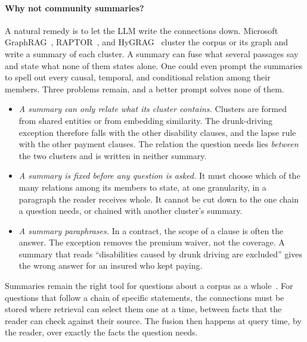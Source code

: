 \documentclass[sigconf, review, anonymous]{acmart}
\begin{document}
\paragraph{Why not community summaries?}
A natural remedy is to let the LLM write the connections down. Microsoft GraphRAG~\cite{edge2024local}, RAPTOR~\cite{sarthi2024raptor}, and HyGRAG~\cite{zhong2026hygrag} cluster the corpus or its graph and write a summary of each cluster. A summary can fuse what several passages say and state what none of them states alone. One could even prompt the summaries to spell out every causal, temporal, and conditional relation among their members. Three problems remain, and a better prompt solves none of them.
\begin{itemize}
  \item \emph{A summary can only relate what its cluster contains.} Clusters are formed from shared entities or from embedding similarity. The drunk-driving exception therefore falls with the other disability clauses, and the lapse rule with the other payment clauses. The relation the question needs lies \emph{between} the two clusters and is written in neither summary.
  \item \emph{A summary is fixed before any question is asked.} It must choose which of the many relations among its members to state, at one granularity, in a paragraph the reader receives whole. It cannot be cut down to the one chain a question needs, or chained with another cluster's summary.
  \item \emph{A summary paraphrases.} In a contract, the scope of a clause is often the answer. The exception removes the premium waiver, not the coverage. A summary that reads ``disabilities caused by drunk driving are excluded'' gives the wrong answer for an insured who kept paying.
\end{itemize}
Summaries remain the right tool for questions about a corpus as a whole~\cite{edge2024local}. For questions that follow a chain of specific statements, the connections must be stored where retrieval can select them one at a time, between facts that the reader can check against their source. The fusion then happens at query time, by the reader, over exactly the facts the question needs.
\end{document}
